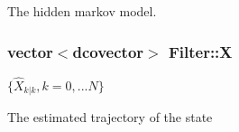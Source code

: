 The hidden markov model. 

\hypertarget{class_filter_fc564c7effa729f11710d78ae0111ec1}{
\subsubsection[{X}]{\setlength{\rightskip}{0pt plus 5cm}vector$<$dcovector$>$ {\bf Filter::X}}}
\label{class_filter_fc564c7effa729f11710d78ae0111ec1}


$ \{ \hat{X}_{k|k} ,k=0,...N \} $ 

The estimated trajectory of the state 